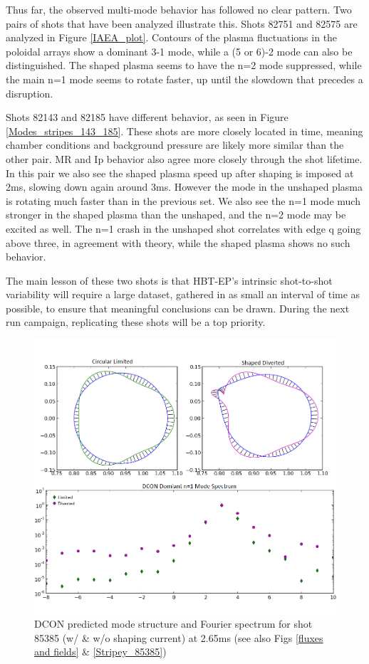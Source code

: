 \documentclass[aps,prl,twocolumn,superscriptaddress,groupedaddress]{revtex4}  %
\begin{document}
	Thus far, the observed multi-mode behavior has followed no clear pattern.  Two pairs of shots that have been analyzed illustrate this.  Shots 82751 and 82575 are analyzed in Figure \ref{IAEA_plot}.  Contours of the plasma fluctuations in the poloidal arrays show a dominant 3-1 mode, while a (5 or 6)-2 mode can also be distinguished.  The shaped plasma seems to have the n=2 mode suppressed, while the main n=1 mode seems to rotate faster, up until the slowdown that precedes a disruption.\par
	Shots 82143 and 82185 have different behavior, as seen in Figure \ref{Modes_stripes_143_185}.  These shots are more closely located in time, meaning chamber conditions and background pressure are likely more similar than the other pair.  MR and Ip behavior also agree more closely through the shot lifetime.  In this pair we also see the shaped plasma speed up after shaping is imposed at 2ms, slowing down again around 3ms.  However the mode in the unshaped plasma is rotating much faster than in the previous set.  We also see the n=1 mode much stronger in the shaped plasma than the unshaped, and the n=2 mode may be excited as well.  The n=1 crash in the unshaped shot correlates with edge q going above three, in agreement with theory, while the shaped plasma shows no such behavior.\par
	The main lesson of these two shots is that HBT-EP's intrinsic shot-to-shot variability will require a large dataset, gathered in as small an interval of time as possible, to ensure that meaningful conclusions can be drawn.  During the next run campaign, replicating these shots will be a top priority.\par
	\begin{figure}[htb]
	\centering
\includegraphics[scale=.35]{../Plots/Dcon_surfaces_n1_dom_85385_85402.png}\caption{DCON predicted mode structure and Fourier spectrum for shot 85385 (w/ \& w/o shaping current) at 2.65ms (see also Figs \ref{fluxes and fields} \& \ref{Stripey_85385})}
	\label{DCON_mode_structure}
	\end{figure}
	
\end{document}
